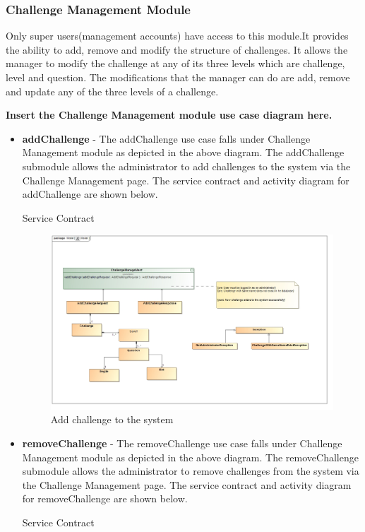 \documentclass[english]{article}
\begin{document}
		\subsubsection{Challenge Management Module}
		Only super users(management accounts) have access to this module.It provides the ability to add, remove and modify the structure of challenges. It allows the manager to modify the challenge at any of its three levels which are challenge, level and question. The modifications that the manager can do are add, remove and update any of the three levels of a challenge.
		
		\textbf{Insert the Challenge Management module use case diagram here.} \newline
		
		\begin{itemize}
			\item \textbf{addChallenge} -  The addChallenge use case falls under Challenge Management module as depicted in the above diagram.  The addChallenge submodule allows the administrator to add challenges to the system via the Challenge Management page. The service contract and activity diagram for addChallenge are shown below.
			\begin{center}
				Service Contract
			\end{center}
			
			\begin{figure}[H]
				\begin{center}
					\includegraphics[scale=0.25]{AddChallengeContract.jpg}
				\end{center}
				\caption{Add challenge to the system}
				
			\end{figure}
			
			
		 \item \textbf{removeChallenge} -  The removeChallenge use case falls under Challenge Management module as depicted in the above diagram.  The removeChallenge submodule allows the administrator to remove challenges from the system via the Challenge Management page. The service contract and activity diagram for removeChallenge are shown below.
			\newpage
		 	\begin{center}
		 		Service Contract
		 	\end{center}
		 	

\end{itemize}
\end{document}
